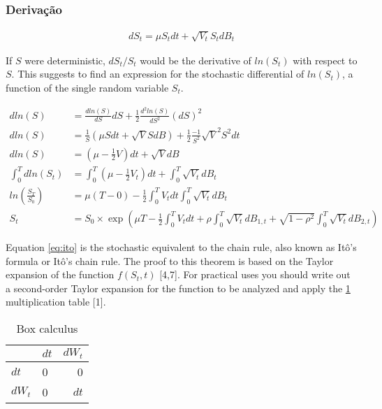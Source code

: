 \documentclass[12pt,twoside]{reedthesis}
\theoremstyle{definition}
\theoremstyle{definition}
\theoremstyle{remark}
\begin{document}
  \subsubsection{Derivação}\label{derivacao}
  
  \begin{align}
  dS_t = \mu S_t dt + \sqrt{V_t} S_t dB_t
  \end{align}
  
  If \(S\) were deterministic, \(dS_t/S_t\) would be the derivative of
  \(ln(S_t)\) with respect to \(S\). This suggests to find an expression
  for the stochastic differential of \(ln(S_t)\), a function of the single
  random variable \(S_t\).
  
  \begin{footnotesize}
  \begin{align}
  dln(S) &= \frac{dln(S)}{dS} dS + \frac{1}{2} \frac{d^2ln(S)}{dS^2}(dS)^2 \\
  dln(S) &= \frac{1}{S} (\mu S dt + \sqrt{V} S dB) + \frac{1}{2}\frac{-1}{S^2}\sqrt{V}^2 S^2 dt \\
  dln(S) &= \left( \mu -  \frac{1}{2} V \right) dt + \sqrt{V} dB \\
  \int_{0}^{T}{dln(S_t)} &= \int_{0}^{T}{\left( \mu - \frac{1}{2} V_t \right) dt} + \int_{0}^{T}{\sqrt{V_t}dB_t} \\
  ln \left( \frac{S_T}{S_0} \right) &= \mu (T-0) - \frac{1}{2}\int_{0}^{T}{V_t dt} \int_{0}^{T}{\sqrt{V_t} dB_  t} \\
  S_t &= S_0 \times \exp \left( \mu T - \frac{1}{2} \int_{0}^{T}{V_t dt} + \rho \int_{0}^{T}{\sqrt{V_t}dB_{1,t}}+ \sqrt{1 - \rho^2} \int_{0}^{T}{\sqrt{V_t}dB_{2,t}} \right)
  \end{align}
  \end{footnotesize}
  
  Equation \eqref{eq:ito} is the stochastic equivalent to the chain rule,
  also known as Itô's formula or Itô's chain rule. The proof to this
  theorem is based on the Taylor expansion of the function \(f(S_t, t)\)
  {[}4,7{]}. For practical uses you should write out a second-order Taylor
  expansion for the function to be analyzed and apply the
  \ref{tab:box-calc} multiplication table {[}1{]}.
  
  \begin{longtable}[t]{llr}
  \caption{\label{tab:box-calc}Box calculus}\\
  \toprule
    & $dt$ & $dW_t$\\
  \midrule
  $dt$ & 0 & 0\\
  $dW_t$ & 0 & $dt$\\
  \bottomrule
  \end{longtable}
  
\end{document}

